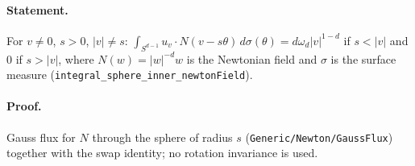 \paragraph{Statement.} For $v\neq0$, $s>0$, $|v|\neq s$: $\int_{S^{d-1}}u_v\cdot N(v-s\theta)\,d\sigma(\theta)=d\omega_d|v|^{1-d}$ if $s<|v|$ and $0$ if $s>|v|$, where
$N(w)=|w|^{-d}w$ is the Newtonian field and $\sigma$ is the surface measure (\texttt{integral\_sphere\_inner\_newtonField}).
\paragraph{Proof.} Gauss flux for $N$ through the sphere of radius $s$ (\texttt{Generic/Newton/GaussFlux}) together with the swap identity; no rotation invariance is used.
